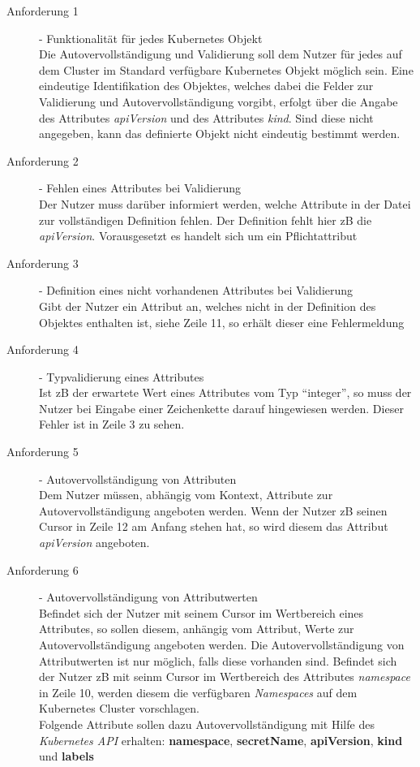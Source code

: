 \begin{description}
      \item[Anforderung 1]{- Funktionalität für jedes Kubernetes Objekt\\}
            Die Autovervollständigung und Validierung soll dem Nutzer für jedes auf dem Cluster im Standard verfügbare Kubernetes Objekt möglich sein.
            Eine eindeutige Identifikation des Objektes, welches dabei die Felder zur Validierung und Autovervollständigung vorgibt, erfolgt über
            die Angabe des Attributes \textit{apiVersion} und des Attributes \textit{kind}. Sind diese nicht angegeben, kann das definierte Objekt nicht
            eindeutig bestimmt werden.
      \item[Anforderung 2]{- Fehlen eines Attributes bei Validierung\\}
            Der Nutzer muss darüber informiert werden, welche Attribute
            in der Datei zur vollständigen Definition fehlen. Der Definition fehlt hier \ac{zB}
            die \textit{apiVersion}. Vorausgesetzt es handelt sich um ein Pflichtattribut
      \item[Anforderung 3]{- Definition eines nicht vorhandenen Attributes bei Validierung\\}
            Gibt der Nutzer ein Attribut an, welches nicht in der Definition des Objektes enthalten ist, siehe Zeile 11, so erhält dieser eine Fehlermeldung
      \item[Anforderung 4]{- Typvalidierung eines Attributes\\}
            Ist \ac{zB} der erwartete Wert eines Attributes vom Typ ``integer'',
            so muss der Nutzer bei Eingabe einer Zeichenkette darauf hingewiesen werden. Dieser Fehler ist in Zeile 3 zu sehen.
      \item[Anforderung 5]{- Autovervollständigung von Attributen\\}
            Dem Nutzer müssen, abhängig vom Kontext, Attribute zur Autovervollständigung angeboten werden.
            Wenn der Nutzer \ac{zB} seinen Cursor in Zeile 12 am Anfang stehen hat, so wird diesem das Attribut \textit{apiVersion} angeboten.
      \item[Anforderung 6]{- Autovervollständigung von Attributwerten\\}
            Befindet sich der Nutzer mit seinem Cursor im Wertbereich eines Attributes, so sollen diesem, anhängig vom Attribut, Werte zur Autovervollständigung
            angeboten werden. Die Autovervollständigung von Attributwerten ist nur möglich, falls diese vorhanden sind.
            Befindet sich der Nutzer \ac{zB} mit seinm Cursor im Wertbereich des Attributes \textit{namespace} in Zeile 10,
            werden diesem die verfügbaren \textit{Namespaces} auf dem Kubernetes Cluster vorschlagen.
            \\
            Folgende Attribute sollen dazu Autovervollständigung mit Hilfe des \textit{Kubernetes API} erhalten:
            \textbf{namespace}, \textbf{secretName}, \textbf{apiVersion}, \textbf{kind} und \textbf{labels}
\end{description}

